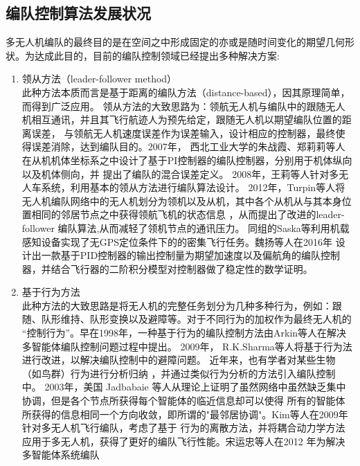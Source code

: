 \subsection{编队控制算法发展状况}
多无人机编队的最终目的是在空间之中形成固定的亦或是随时间变化的期望几何形状。为达成此目的，目前的编队控制领域已经提出多种解决方案:
\begin{enumerate}
    \item 领从方法（leader-follower method）\\
        此种方法本质而言是基于距离的编队方法（distance-based），因其原理简单，而得到广泛应用。
        领从方法的大致思路为：领航无人机与编队中的跟随无人机相互通讯，并且其飞行航迹人为预先给定，跟随无人机以期望编队位置的距离误差，
        与领航无人机速度误差作为误差输入，设计相应的控制器，最终使得误差消除，达到编队目的。2007年，
        西北工业大学的朱战霞、郑莉莉等人在从机机体坐标系之中设计了基于PI控制器的编队控制器，分别用于机体纵向以及机体侧向，并
        提出了编队的混合误差定义。\cite{ZhuZhanXia2007}
        2008年，王莉等人针对多无人车系统，利用基本的领从方法进行编队算法设计。\cite{WangLi2008}
        2012年，Turpin等人将无人机编队网络中的无人机划分为领机以及从机，其中各个从机从与其本身位置相同的邻居节点之中获得领航飞机的状态信息
        ，从而提出了改进的leader-follower 编队算法,从而减轻了领机节点的通讯压力。
        \cite{Turpin2012Trajectory}同组的Saska等利用机载感知设备实现了无GPS定位条件下的的密集飞行任务。\cite{Saska2017System}魏扬等人在2016年
        设计出一款基于PID控制器的输出控制量为期望加速度以及偏航角的编队控制器，并结合飞行器的二阶积分模型对控制器做了稳定性的数学证明。\cite{WeiYang2016}
    \item 基于行为方法\\
        此种方法的大致思路是将无人机的完整任务划分为几种多种行为，例如：跟随、队形维持、队形变换以及避障等。对于不同行为的加权作为最终无人机的
        “控制行为”。早在1998年，一种基于行为的编队控制方法由Arkin等人在解决多智能体编队控制问题过程中提出。\cite{Balch1998Behavior} 2009年，
        R.K.Sharma等人将基于行为法进行改进，以解决编队控制中的避障问题。\cite{Sharma2009Collision} 近年来，也有学者对某些生物（如鸟群）行为进行分析归纳
        ，并通过类似行为分析的方法引入编队控制中。
        2003年，美国 Jadbabaie 等人从理论上证明了虽然网络中虽然缺乏集中协调，但是各个节点所获得每个智能体的临近信息却可以使得
        所有的智能体所获得的信息相同一个方向收敛，即所谓的"最邻居协调"。\cite{Jadbabaie2003Coordination}Kim等人在2009年针对多无人机飞行编队，考虑了基于
        行为的离散方法，并将耦合动力学方法应用于多无人机，获得了更好的编队飞行性能。\cite{Kim2009}宋运忠等人在2012 年为解决多智能体系统编队

\end{enumerate}

